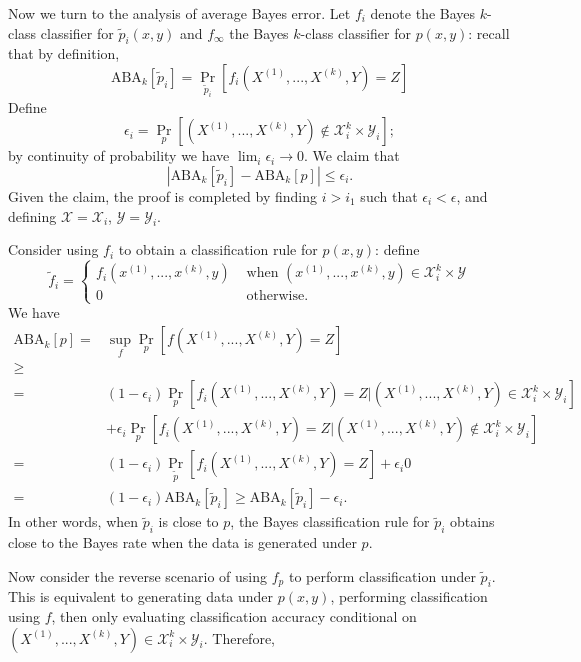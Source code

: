 \documentclass[12pt]{article}
\begin{document}
Now we turn to the analysis of average Bayes error.
Let $f_i$ denote the Bayes $k$-class classifier for $\tilde{p}_i(x, y)$
and
$f_\infty$ the Bayes $k$-class classifier for $p(x, y)$: recall that by definition,
\[
\text{ABA}_k[\tilde{p}_i] = \Pr_{\tilde{p}_i}[f_i(X^{(1)},...,X^{(k)}, Y) = Z]
\]
Define
\[
\epsilon_i = \Pr_p[(X^{(1)},...,X^{(k)}, Y)\notin \mathcal{X}_i^k \times \mathcal{Y}_i];
\]
by continuity of probability we have $\lim_i \epsilon_i \to 0$.
We claim that
\[
|\text{ABA}_k[\tilde{p}_i] - \text{ABA}_k[p]| \leq \epsilon_i.
\]
Given the claim, the proof is completed by finding $i > i_1$ such that $\epsilon_i < \epsilon$,
and defining $\mathcal{X} = \mathcal{X}_i$, $\mathcal{Y} = \mathcal{Y}_i$.

Consider using $f_i$ to obtain a classification rule for $p(x, y)$:
define
\[
\tilde{f}_i = \begin{cases}f_i(x^{(1)},...,x^{(k)}, y) & \text{ when } (x^{(1)},...,x^{(k)}, y) \in \mathcal{X}_i^k \times \mathcal{Y}\\
0 & \text{ otherwise.} 
\end{cases}
\]
We have
\begin{align*}
\text{ABA}_k[p] =& \sup_f \Pr_p[f(X^{(1)},...,X^{(k)}, Y) = Z]
\\ \geq& 
\\=& (1-\epsilon_i)\Pr_p[f_i(X^{(1)},...,X^{(k)}, Y) = Z|(X^{(1)},...,X^{(k)}, Y)\in \mathcal{X}_i^k \times \mathcal{Y}_i]
\\&+ \epsilon_i \Pr_p[f_i(X^{(1)},...,X^{(k)}, Y) = Z|(X^{(1)},...,X^{(k)}, Y)\notin \mathcal{X}_i^k \times \mathcal{Y}_i]
\\=& (1-\epsilon_i)\Pr_{\tilde{p}}[f_i(X^{(1)},...,X^{(k)}, Y) = Z]
+ \epsilon_i 0
\\=& (1-\epsilon_i) \text{ABA}_k[\tilde{p}_i] \geq \text{ABA}_k[\tilde{p}_i] - \epsilon_i.
\end{align*}
In other words, when $\tilde{p}_i$ is close to $p$, the Bayes
classification rule for $\tilde{p}_i$ obtains close to the Bayes rate
when the data is generated under $p$.

Now consider the reverse scenario of using $f_p$ to perform
classification under $\tilde{p}_i$.  This is equivalent to generating
data under $p(x, y)$, performing classification using $f$, then only
evaluating classification accuracy conditional on $(X^{(1)},...,X^{(k)},
Y)\in \mathcal{X}_i^k \times \mathcal{Y}_i$.  Therefore,
\end{document}
